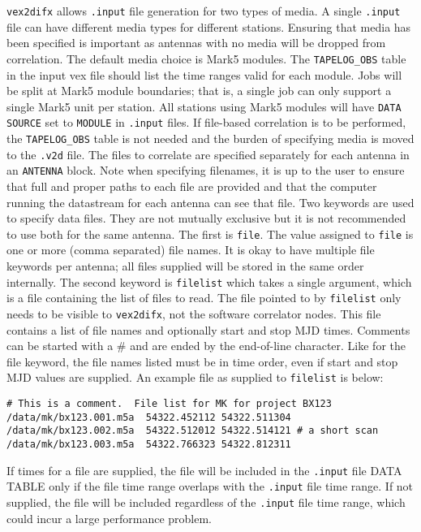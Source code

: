 {\tt vex2difx} allows {\tt .input} file generation for two types of media.
A single {\tt .input} file can have different media types for different stations. 
Ensuring that media has been specified is important as antennas with no media will be dropped from correlation.
The default media choice is Mark5 modules.
The {\tt TAPELOG\_OBS} table in the input vex file should list the time ranges valid for each module.
Jobs will be split at Mark5 module boundaries; that is, a single job can only support a single Mark5 unit per station.
All stations using Mark5 modules will have {\tt DATA SOURCE} set to {\tt MODULE} in {\tt .input} files. 
If file-based correlation is to be performed, the {\tt TAPELOG\_OBS} table is not needed and the burden of specifying media is moved to the {\tt .v2d} file. 
The files to correlate are specified separately for each antenna in an {\tt ANTENNA} block.
Note when specifying filenames, it is up to the user to ensure that full and proper paths to each file are provided and that the computer running the datastream for each antenna can see that file.
Two keywords are used to specify data files.
They are not mutually exclusive but it is not recommended to use both for the same antenna.
The first is {\tt file}.
The value assigned to {\tt file} is one or more (comma separated) file names.
It is okay to have multiple file keywords per antenna; all files supplied will be stored in the same order internally.
The second keyword is {\tt filelist} which takes a single argument, which is a file containing the list of files to read.
The file pointed to by {\tt filelist} only needs to be visible to {\tt vex2difx}, not the software correlator nodes. 
This file contains a list of file names and optionally start and stop MJD times.
Comments can be started with a \# and are ended by the end-of-line character.
Like for the file keyword, the file names listed must be in time order, even if start and stop MJD values are supplied.
An example file as supplied to {\tt filelist} is below:

\begin{verbatim}
# This is a comment.  File list for MK for project BX123
/data/mk/bx123.001.m5a  54322.452112 54322.511304
/data/mk/bx123.002.m5a  54322.512012 54322.514121 # a short scan
/data/mk/bx123.003.m5a  54322.766323 54322.812311 
\end{verbatim}

If times for a file are supplied, the file will be included in the {\tt .input} file DATA TABLE only if the file time range overlaps with the {\tt .input} file time range.
If not supplied, the file will be included regardless of the {\tt .input} file time range, which could incur a large performance problem.

